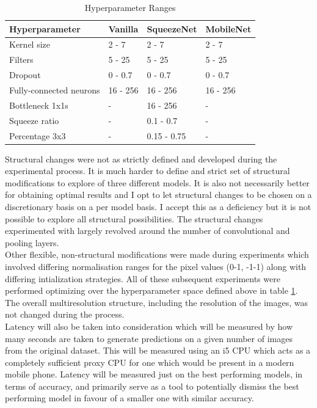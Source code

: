 \documentclass{article}
\begin{document}
{\begin{table}[h!]
  \begin{center}
    \caption{Hyperparameter Ranges}
    \label{tab:table1}
    \begin{tabular}{l|l|l|l}
      \textbf{Hyperparameter} & \textbf{Vanilla} &                          \textbf{SqueezeNet} & \textbf{MobileNet}\\
      \hline
      Kernel size & 2 - 7 & 2 - 7 & 2 - 7\\
      Filters & 5 - 25 & 5 - 25 & 5 - 25\\
      Dropout & 0 - 0.7 & 0 - 0.7 & 0 - 0.7\\
      Fully-connected neurons & 16 - 256 & 16 - 256 & 16 - 256\\
      Bottleneck 1x1s & - & 16 - 256 & - \\
      Squeeze ratio & - & 0.1 - 0.7 & - \\
      Percentage 3x3 & - & 0.15 - 0.75 & - \\
    \end{tabular}
  \end{center}
\end{table}

Structural changes were not as strictly defined and developed during the experimental process. It is much harder to define and strict set of structural modifications to explore of three different models. It is also not necessarily better for obtaining optimal results and I opt to let structural changes to be chosen on a discretionary basis on a per model basis. I accept this as a deficiency but it is not possible to explore all structural possibilities. The structural changes experimented with largely revolved around the number of convolutional and pooling layers. \\

Other flexible, non-structural modifications were made during experiments which involved differing normalisation ranges for the pixel values (0-1, -1-1) along with differing intialization strategies. All of these subsequent experiments were performed optimizing over the hyperparameter space defined above in table \ref{tab:table1}. The overall multiresolution structure, including the resolution of the images, was not changed during the process. \\

Latency will also be taken into consideration which will be measured by how many seconds are taken to generate predictions on a given number of images from the original dataset. This will be measured using an i5 CPU which acts as a completely sufficient proxy CPU for one which would be present in a modern mobile phone. Latency will be measured just on the best performing models, in terms of accuracy, and primarily serve as a tool to potentially dismiss the best performing model in favour of a smaller one with similar accuracy. \\

}
\end{document}
